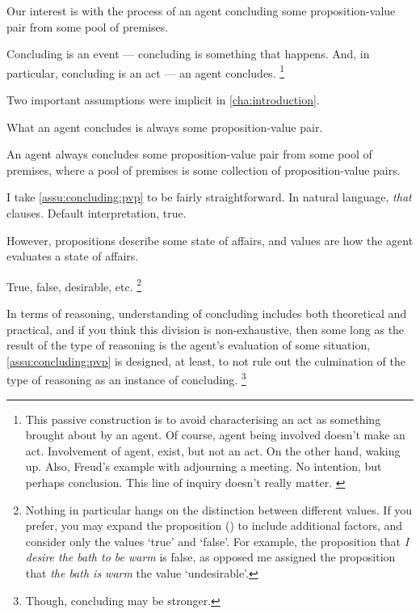 \begin{note}
  Our interest is with the process of an agent concluding some proposition-value pair from some pool of premises.

  Concluding is an event --- concluding is something that happens.
  And, in particular, concluding is an act --- an agent concludes.%
  \footnote{
    \color{red}
    This passive construction is to avoid characterising an act as something brought about by an agent.
    Of course, agent being involved doesn't make an act.
    Involvement of agent, exist, but not an act.
    On the other hand, waking up.
    {
      \color{red}
      Also, Freud's example with adjourning a meeting.
      No intention, but perhaps conclusion.
    }
    {
      \color{red} This line of inquiry doesn't really matter.
    }
  }

  Two important assumptions were implicit in \autoref{cha:introduction}.

  \begin{assumption}
    \label{assu:concluding:pvp}
    What an agent concludes is always some proposition-value pair.
  \end{assumption}

  \begin{assumption}
    \label{assu:concluding:pools}
    An agent always concludes some proposition-value pair from some pool of premises, where a pool of premises is some collection of proposition-value pairs.
  \end{assumption}
\end{note}

\begin{note}
  I take \autoref{assu:concluding:pvp} to be fairly straightforward.
  In natural language, \emph{that} clauses.
  Default interpretation, true.

  However, propositions describe some state of affairs, and values are how the agent evaluates a state of affairs.

  True, false, desirable, etc.%
  \footnote{
    Nothing in particular hangs on the distinction between different values.
    If you prefer, you may expand the proposition (\world{}) to include additional factors, and consider only the values `true' and `false'.
    For example, the proposition that \emph{I desire the bath to be warm} is false, as opposed me assigned the proposition that \emph{the bath is warm} the value `undesirable'.
  }

  In terms of reasoning, understanding of concluding includes both theoretical and practical, and if you think this division is non-exhaustive, then some long as the result of the type of reasoning is the agent's evaluation of some situation, \autoref{assu:concluding:pvp} is designed, at least, to not rule out the culmination of the type of reasoning as an instance of concluding.%
  \footnote{
    Though, concluding may be stronger.
  }
\end{note}

